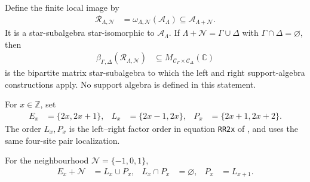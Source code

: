 \begin{definition}
    \label{def:qca_bipartite_finite_local_image}
    \leanok
    Define the finite local image by
    \begin{align}
        \mathcal R_{\Lambda,\mathcal N}
         & =\omega_{\Lambda,\mathcal N}(\mathcal A_\Lambda)
        \subseteq\mathcal A_{\Lambda+\mathcal N}.
    \end{align}
    It is a star-subalgebra star-isomorphic to $\mathcal A_\Lambda$.  If
    $\Lambda+\mathcal N=\Gamma\cup\Delta$ with
    $\Gamma\cap\Delta=\varnothing$, then
    \begin{align}
        \beta_{\Gamma,\Delta}
        (\mathcal R_{\Lambda,\mathcal N})
         & \subseteq
        M_{\mathcal C_\Gamma\times\mathcal C_\Delta}(\mathbb C)
    \end{align}
    is the bipartite matrix star-subalgebra to which the left and right
    support-algebra constructions apply.  No support algebra is defined in
    this statement.
\end{definition}

\begin{definition}
    \label{def:qca_nearest_neighbor_pair_regions}
    \leanok
    For $x\in\mathbb Z$, set
    \begin{align}
        E_x & =\{2x,2x+1\},   &
        L_x & =\{2x-1,2x\},   &
        P_x & =\{2x+1,2x+2\}.
        \label{eq:qca_pair_regions}
    \end{align}
    The order $L_x,P_x$ is the left--right factor order in equation
    \texttt{RR2x} of
    \cite[lines~1251--1266]{Gross2012IndexTheory}, and \cite[lines~2313--2318]{Cirac2017MPU} uses the same four-site
    pair
    localization.
\end{definition}

\begin{lemma}
    \label{lem:qca_nearest_neighbor_pair_geometry}
    \leanok
    For the neighbourhood $\mathcal N=\{-1,0,1\}$,
    \begin{align}
        E_x+\mathcal N & =L_x\cup P_x, &
        L_x\cap P_x    & =\varnothing, &
        P_x            & =L_{x+1}.
        \label{eq:qca_pair_geometry}
    \end{align}
\end{lemma}

